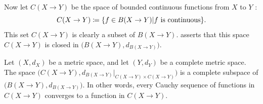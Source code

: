 \begin{note}
  Now let \(C(X \to Y)\) be the space of bounded continuous functions from \(X\) to \(Y\) :
  \[
    C(X \to Y) \coloneqq \set{f \in B(X \to Y) | f \text{ is continuous}}.
  \]
  This set \(C(X \to Y)\) is clearly a subset of \(B(X \to Y)\).
   asserts that this space \(C(X \to Y)\) is closed in \(\big(B(X \to Y), d_{B(X \to Y)}\big)\).
\end{note}

\begin{thm}\label{ii:3.4.5}
  Let \((X, d_X)\) be a metric space, and let \((Y, d_Y)\) be a complete metric space.
  The space \(\big(C(X \to Y), d_{B(X \to Y)}|_{C(X \to Y) \times C(X \to Y)}\big)\) is a complete subspace of \(\big(B(X \to Y), d_{B(X \to Y)}\big)\).
  In other words, every Cauchy sequence of functions in \(C(X \to Y)\) converges to a function in \(C(X \to Y)\).
\end{thm}

